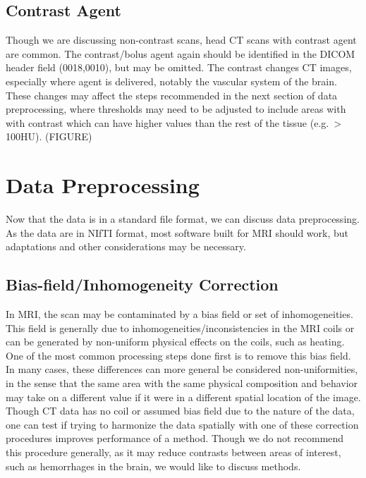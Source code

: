 \documentclass[]{elsarticle} %
\begin{document}
\hypertarget{contrast-agent}{%
\subsection{Contrast Agent}\label{contrast-agent}}

Though we are discussing non-contrast scans, head CT scans with contrast agent are common. The contrast/bolus agent again should be identified in the DICOM header field (0018,0010), but may be omitted. The contrast changes CT images, especially where agent is delivered, notably the vascular system of the brain. These changes may affect the steps recommended in the next section of data preprocessing, where thresholds may need to be adjusted to include areas with with contrast which can have higher values than the rest of the tissue (e.g.~\textgreater{} 100HU). (FIGURE)

\hypertarget{data-preprocessing}{%
\section{Data Preprocessing}\label{data-preprocessing}}

Now that the data is in a standard file format, we can discuss data preprocessing. As the data are in NIfTI format, most software built for MRI should work, but adaptations and other considerations may be necessary.

\hypertarget{bias-fieldinhomogeneity-correction}{%
\subsection{Bias-field/Inhomogeneity Correction}\label{bias-fieldinhomogeneity-correction}}

In MRI, the scan may be contaminated by a bias field or set of inhomogeneities. This field is generally due to inhomogeneities/inconsistencies in the MRI coils or can be generated by non-uniform physical effects on the coils, such as heating. One of the most common processing steps done first is to remove this bias field. In many cases, these differences can more general be considered non-uniformities, in the sense that the same area with the same physical composition and behavior may take on a different value if it were in a different spatial location of the image. Though CT data has no coil or assumed bias field due to the nature of the data, one can test if trying to harmonize the data spatially with one of these correction procedures improves performance of a method. Though we do not recommend this procedure generally, as it may reduce contrasts between areas of interest, such as hemorrhages in the brain, we would like to discuss methods.
\end{document}
